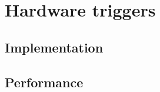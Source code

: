 
\chapter{Hardware triggers}
\label{chap:hardware-triggers}


\section{Implementation}
\label{sec:hardware-triggers-implementation}

\section{Performance}
\label{sec:hardware-triggers-performance}




